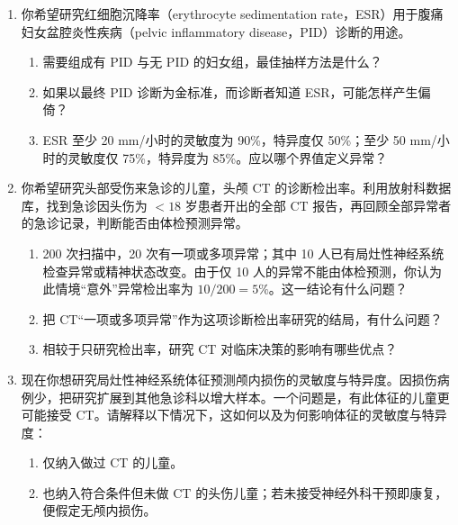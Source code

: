 \begin{enumerate}
\item 你希望研究红细胞沉降率（erythrocyte sedimentation rate，ESR）用于腹痛妇女盆腔炎性疾病（pelvic inflammatory disease，PID）诊断的用途。
\begin{enumerate}
\item 需要组成有 PID 与无 PID 的妇女组，最佳抽样方法是什么？
\item 如果以最终 PID 诊断为金标准，而诊断者知道 ESR，可能怎样产生偏倚？
\item ESR 至少 20 mm/小时的灵敏度为 90\%，特异度仅 50\%；至少 50 mm/小时的灵敏度仅 75\%，特异度为 85\%。应以哪个界值定义异常？
\end{enumerate}
\item 你希望研究头部受伤来急诊的儿童，头颅 CT 的诊断检出率。利用放射科数据库，找到急诊因头伤为 $<18$ 岁患者开出的全部 CT 报告，再回顾全部异常者的急诊记录，判断能否由体检预测异常。
\begin{enumerate}
\item 200 次扫描中，20 次有一项或多项异常；其中 10 人已有局灶性神经系统检查异常或精神状态改变。由于仅 10 人的异常不能由体检预测，你认为此情境“意外”异常检出率为 $10/200=5\%$。这一结论有什么问题？
\item 把 CT“一项或多项异常”作为这项诊断检出率研究的结局，有什么问题？
\item 相较于只研究检出率，研究 CT 对临床决策的影响有哪些优点？
\end{enumerate}
\item 现在你想研究局灶性神经系统体征预测颅内损伤的灵敏度与特异度。因损伤病例少，把研究扩展到其他急诊科以增大样本。一个问题是，有此体征的儿童更可能接受 CT。请解释以下情况下，这如何以及为何影响体征的灵敏度与特异度：
\begin{enumerate}
\item 仅纳入做过 CT 的儿童。
\item 也纳入符合条件但未做 CT 的头伤儿童；若未接受神经外科干预即康复，便假定无颅内损伤。
\end{enumerate}
\end{enumerate}
